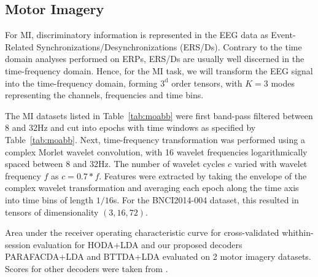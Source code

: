 \documentclass[twocolumn]{article}
\begin{document}
\subsection{Motor Imagery}
For MI, discriminatory information is represented in the EEG data as
Event-Related Synchronizations/Desynchronizations (ERS/Ds).
Contrary to the time domain analyses performed on ERPs, ERS/Ds are usually well
discerned in the time-frequency domain.
Hence, for the MI task, we will transform the EEG signal into the
time-frequency domain, forming $3^\text{d}$ order tensors, with $K=3$ modes
representing the channels, frequencies and time bins.

The MI datasets listed in Table~\ref{tab:moabb} were first band-pass filtered
between 8 and 32Hz and cut into
epochs with time windows as specified by Table~\ref{tab:moabb}.
Next, time-frequency transformation was performed using a complex Morlet wavelet
convolution, with 16 wavelet frequencies logarithmically spaced between 8 and
32Hz.
The number of wavelet cycles $c$ varied with wavelet frequency $f$ as
$c=0.7*f$.
Features were extracted by taking the envelope of the complex wavelet
transformation and
averaging each epoch along the time axis into time bins of
length $1/16$s.
For the BNCI2014-004 dataset, this resulted in tensors of dimensionality
$(3,16,72)$.

\begin{table}[t]
	\footnotesize
	
	\caption{Area under the receiver operating characteristic curve for
		cross-validated whithin-session evaluation for HODA+LDA and our proposed decoders
		PARAFACDA+LDA and BTTDA+LDA evaluated on 2 motor imagery datasets.
		Scores for other decoders were taken from \cite{Chevallier2024}.}
	\label{tab:mi-score}
\end{table}
\end{document}
